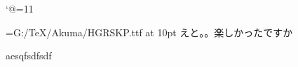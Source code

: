 \catcode`@=11\relax



\font\LD@Font@Kana={G:/TeX/Akuma/HGRSKP.ttf} at 10pt %
\LD@Font@Kana
えと。。楽しかったですか

aesqfsdfsdf
\bye